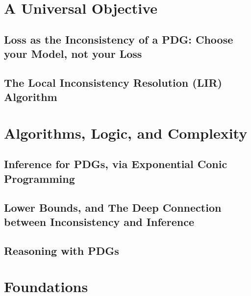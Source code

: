 \documentclass[tocprelim,
    ]{cornellmodified}
\begin{document}
\part{A Universal Objective} \label{part:univ-objective}

\chapter{Loss as the Inconsistency of a PDG: 
    Choose your Model, not your Loss}
    
\chapter{ The Local Inconsistency Resolution (LIR) Algorithm }
    
    
\part{Algorithms, Logic, and Complexity%
    } \label{part:algo-logic-complexity}

\chapter{Inference for PDGs, via Exponential Conic Programming}
    

\chapter[Lower Bounds, and the Deep Connection\texorpdfstring{\\}{}between Inconsistency and Inference]%
    {Lower Bounds, and The Deep Connection between Inconsistency and Inference}
    

\chapter{Reasoning with PDGs}
    


\part{Foundations} \label{part:foundations}
\end{document}
